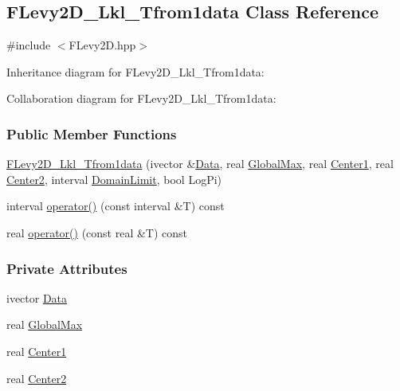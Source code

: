 \hypertarget{classFLevy2D__Lkl__Tfrom1data}{\subsection{\-F\-Levy2\-D\-\_\-\-Lkl\-\_\-\-Tfrom1data \-Class \-Reference}
\label{classFLevy2D__Lkl__Tfrom1data}
}


{\ttfamily \#include $<$\-F\-Levy2\-D.\-hpp$>$}



\-Inheritance diagram for \-F\-Levy2\-D\-\_\-\-Lkl\-\_\-\-Tfrom1data\-:


\-Collaboration diagram for \-F\-Levy2\-D\-\_\-\-Lkl\-\_\-\-Tfrom1data\-:
\subsubsection*{\-Public \-Member \-Functions}
\begin{DoxyCompactItemize}
\item 
\hyperlink{classFLevy2D__Lkl__Tfrom1data_af3dbaaec74847fde9ffd754e4b295278}{\-F\-Levy2\-D\-\_\-\-Lkl\-\_\-\-Tfrom1data} (ivector \&\hyperlink{classFLevy2D__Lkl__Tfrom1data_a164feef005f7cd698ef7e737479376d9}{\-Data}, real \hyperlink{classFLevy2D__Lkl__Tfrom1data_a76c6284c5bb945dcbdd9e0b4e93b7159}{\-Global\-Max}, real \hyperlink{classFLevy2D__Lkl__Tfrom1data_a65a223e801a809656bd2918d3f57e449}{\-Center1}, real \hyperlink{classFLevy2D__Lkl__Tfrom1data_aeadb884eb472f4b9a7fe739dc636f924}{\-Center2}, interval \hyperlink{LevyFobj2D_8cpp_ae28a2599911ae746bc33211d3ea52aaf}{\-Domain\-Limit}, bool \-Log\-Pi)
\item 
interval \hyperlink{classFLevy2D__Lkl__Tfrom1data_a06a1515d0efad766651950946e4fac03}{operator()} (const interval \&\-T) const 
\item 
real \hyperlink{classFLevy2D__Lkl__Tfrom1data_ad420bcdc039ecc689488181c23aae0bb}{operator()} (const real \&\-T) const 
\end{DoxyCompactItemize}
\subsubsection*{\-Private \-Attributes}
\begin{DoxyCompactItemize}
\item 
ivector \hyperlink{classFLevy2D__Lkl__Tfrom1data_a164feef005f7cd698ef7e737479376d9}{\-Data}
\item 
real \hyperlink{classFLevy2D__Lkl__Tfrom1data_a76c6284c5bb945dcbdd9e0b4e93b7159}{\-Global\-Max}
\item 
real \hyperlink{classFLevy2D__Lkl__Tfrom1data_a65a223e801a809656bd2918d3f57e449}{\-Center1}
\item 
real \hyperlink{classFLevy2D__Lkl__Tfrom1data_aeadb884eb472f4b9a7fe739dc636f924}{\-Center2}
\end{DoxyCompactItemize}


